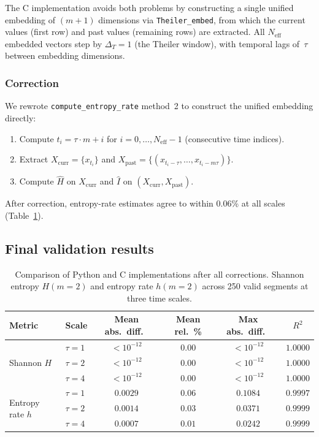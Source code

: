 \documentclass[12pt,a4paper]{article}
\newcommand{\Neff}{N_{\mathrm{eff}}}
\begin{document}
The C implementation avoids both problems by constructing a single unified embedding of $(m+1)$ dimensions via \texttt{Theiler\_embed}, from which the current values (first row) and past values (remaining rows) are extracted.
All $\Neff$ embedded vectors step by $\Delta_T = 1$ (the Theiler window), with temporal lags of~$\tau$ between embedding dimensions.

\subsubsection{Correction}
We rewrote \texttt{compute\_entropy\_rate} method~2 to construct the unified embedding directly:
\begin{enumerate}
  \item Compute $t_i = \tau \cdot m + i$ for $i = 0, \ldots, \Neff - 1$ (consecutive time indices).
  \item Extract $X_{\mathrm{curr}} = \{x_{t_i}\}$ and $X_{\mathrm{past}} = \{(x_{t_i - \tau}, \ldots, x_{t_i - m\tau})\}$.
  \item Compute $\hat{H}$ on $X_{\mathrm{curr}}$ and $\hat{I}$ on $(X_{\mathrm{curr}}, X_{\mathrm{past}})$.
\end{enumerate}

After correction, entropy-rate estimates agree to within 0.06\% at all scales (Table~\ref{tab:results}).


\subsection{Final validation results}\label{sec:final}

\begin{table}[t]
\centering
\caption{Comparison of Python and C implementations after all corrections. Shannon entropy $H(m{=}2)$ and entropy rate $h(m{=}2)$ across 250 valid segments at three time scales.}\label{tab:results}
\begin{tabular}{@{}llcccc@{}}
\toprule
Metric & Scale & Mean abs.\ diff.\ & Mean rel.\ \% & Max abs.\ diff.\ & $R^2$ \\
\midrule
\multirow{3}{*}{Shannon $H$} & $\tau = 1$ & $< 10^{-12}$ & $0.00$ & $< 10^{-12}$ & $1.0000$ \\
                              & $\tau = 2$ & $< 10^{-12}$ & $0.00$ & $< 10^{-12}$ & $1.0000$ \\
                              & $\tau = 4$ & $< 10^{-12}$ & $0.00$ & $< 10^{-12}$ & $1.0000$ \\
\midrule
\multirow{3}{*}{Entropy rate $h$} & $\tau = 1$ & $0.0029$ & $0.06$ & $0.1084$ & $0.9997$ \\
                                  & $\tau = 2$ & $0.0014$ & $0.03$ & $0.0371$ & $0.9999$ \\
                                  & $\tau = 4$ & $0.0007$ & $0.01$ & $0.0242$ & $0.9999$ \\
\bottomrule
\end{tabular}
\end{table}
\end{document}
